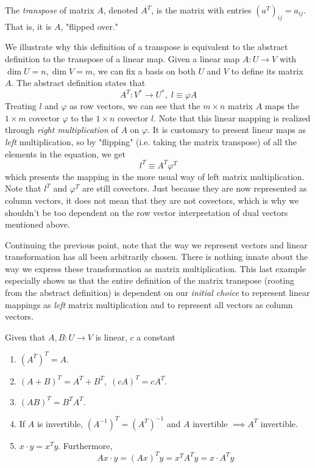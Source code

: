 \documentclass{article}
\begin{document}
    \begin{definition}
    The \textit{transpose} of matrix $A$, denoted $A^T$, is the matrix with entries $(a^T)_{i j} = a_{i j}$. That is, it is $A$, "flipped over." 
    \end{definition}

    We illustrate why this definition of a transpose is equivalent to the abstract definition to the transpose of a linear map. Given a linear map $A: U \longrightarrow V$ with $\dim U = n, \dim V = m$, we can fix a basis on both $U$ and $V$ to define its matrix $A$. The abstract definition states that 
    \[ A^T: V^* \longrightarrow U^*, \; l \equiv \varphi A\]
    Treating $l$ and $\varphi$ as row vectors, we can see that the $m \times n$ matrix $A$ maps the $1 \times m$ covector $\varphi$ to the $1 \times n$ covector $l$. Note that this linear mapping is realized through \textit{right multiplication} of $A$ on $\varphi$. It is customary to present linear maps as \textit{left} multiplication, so by "flipping" (i.e. taking the matrix transpose) of all the elements in the equation, we get 
    \[ l^T \equiv A^T \varphi^T \]
    which presents the mapping in the more usual way of left matrix multiplication. Note that $l^T$ and $\varphi^T$ are still covectors. Just because they are now represented as column vectors, it does not mean that they are not covectors, which is why we shouldn't be too dependent on the row vector interpretation of dual vectors mentioned above.  

    Continuing the previous point, note that the way we represent vectors and linear transformation has all been arbitrarily chosen. There is nothing innate about the way we express these transformation as matrix multiplication. This last example especially shows us that the entire definition of the matrix transpose (rooting from the abstract definition) is dependent on our \textit{initial choice} to represent linear mappings as \textit{left} matrix multiplication and to represent all vectors as column vectors. 

    \begin{theorem}
    Given that $A, B: U \longrightarrow V$ is linear, $c$ a constant
    \begin{enumerate}
        \item $(A^T)^T = A$. 
        \item $(A+B)^T = A^T + B^T, \; (c A)^T = c A^T$. 
        \item $(A B)^T = B^T A^T$. 
        \item If $A$ is invertible, $(A^{-1})^T = (A^T)^{-1}$ and $A$ invertible $\implies A^T$ invertible. 
        \item $x \cdot y = x^T y$. Furthermore, 
    \[Ax \cdot y = (A x)^T y = x^T A^T y = x \cdot A^T y\]
    \end{enumerate}
    \end{theorem}
\end{document}
